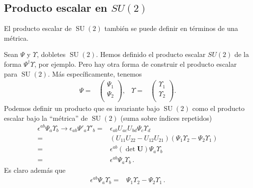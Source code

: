 \subsection{Producto escalar en $SU(2)$}
El producto escalar de $\operatorname{SU}(2)$ también se puede definir en términos de una métrica.

\begin{frame}
  Sean $\Psi$ y $\Upsilon$, dobletes $\operatorname{SU}(2)$. Hemos definido el producto escalar $SU(2)$ de la forma $\Psi^{\dagger}\Upsilon$, por ejemplo. Pero hay otra forma de construir el producto escalar para $\operatorname{SU}(2)$. Más específicamente, tenemos
\begin{align}
  \Psi=&
  \begin{pmatrix}
    \Psi_1\\
    \Psi_2\\
  \end{pmatrix},&
  \Upsilon=&
  \begin{pmatrix}
    \Upsilon_1\\
    \Upsilon_2\\
  \end{pmatrix}.
\end{align}
Podemos definir un producto que es invariante bajo $\operatorname{SU}(2)$ como el producto escalar bajo la ``métrica'' de $\operatorname{SU}(2)$ (suma sobre índices repetidos)
\begin{align}
\epsilon^{ab}\Psi_a \Upsilon_b\to \epsilon_{ab}\Psi'_a \Upsilon'_b=&\epsilon_{ab}U_{ac}U_{bd}\Psi_c \Upsilon_d\nonumber\\
  =&\left( U_{11}U_{22}-U_{12}U_{21} \right)\left(\Psi_1\Upsilon_2-\Psi_2\Upsilon_1  \right)\nonumber\\
  =&\epsilon^{ab}\left( \det\mathbf{U} \right) \Psi_a \Upsilon_b\nonumber\\
  =&\epsilon^{ab} \Psi_a \Upsilon_b\,.
\end{align}
Es claro además que
\begin{align}
  \epsilon^{ab}\Psi_a \Upsilon_b=&\Psi_1 \Upsilon_2-\Psi_2 \Upsilon_1 \,.
 \end{align}



\end{frame}
